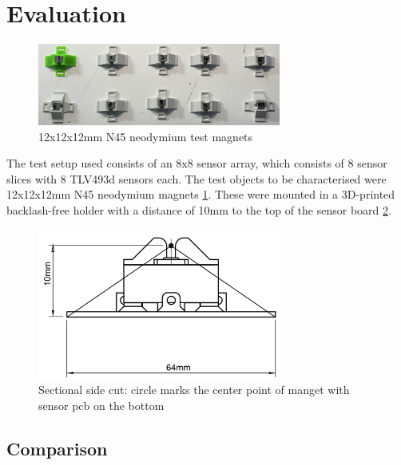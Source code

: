 \documentclass[conference]{IEEEtran}
\begin{document}

\section{Evaluation}

\begin{figure}[htbp]
\centerline{\includegraphics[width=8cm]{magnets_with_holder.jpg}}
\caption{12x12x12mm N45 neodymium test magnets }
\label{mag_with_holder_fig}
\end{figure}

The test setup used consists of an 8x8 sensor array, which consists of 8 sensor slices with 8 TLV493d sensors each.
The test objects to be characterised were 12x12x12mm N45 neodymium magnets \ref{mag_with_holder_fig}.
These were mounted in a 3D-printed backlash-free holder with a distance of 10mm to the top of the sensor board \ref{mag_pcb_side_cut_fig}.


\begin{figure}[htbp]
\centerline{\includegraphics[width=8cm]{magnet_pcb_drawing.png}}
\caption{Sectional side cut: circle marks the center point of manget with sensor pcb on the bottom}
\label{mag_pcb_side_cut_fig}
\end{figure}



\subsection{Comparison}
\end{document}
